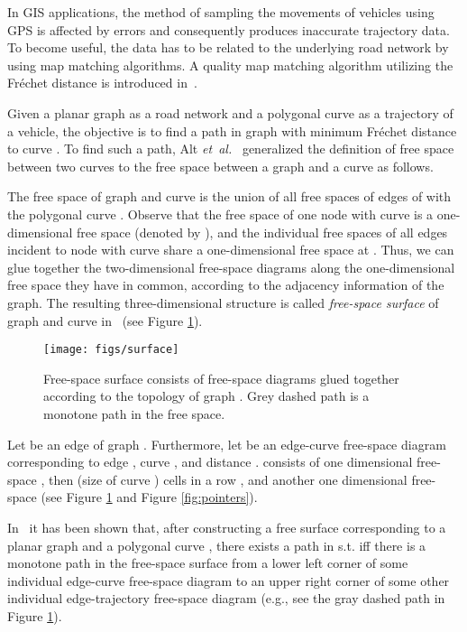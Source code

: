 \documentclass[12pt]{dalthesis}
\newcommand{\etal}{{\em et~al.\/}}
\newcommand{\Frechet}{Fr\'echet }
\begin{document}
In GIS applications, the method of sampling the  movements of vehicles using GPS is affected 
by errors and consequently produces inaccurate trajectory data. To become useful, 
the data has to be related to the underlying road network by using map matching 
algorithms. A quality map matching algorithm utilizing the \Frechet distance is 
introduced in~\cite{AltERW03a}.

Given a planar graph  as a road network and a polygonal curve  as a 
trajectory of a vehicle, the objective is to find a path   
in graph  with minimum \Frechet distance to curve . To find such a path, 
Alt \etal ~\cite{AltERW03a} generalized  the definition of free space 
between two curves to the free space between a graph and a curve as follows.

The free space of graph   and  curve  is the union of all free spaces of edges of 
 with the polygonal curve . Observe that the free space of one node  with 
curve  is a one-dimensional free space (denoted by ), 
and the individual free spaces of all 	edges 
incident to node  with curve  share a one-dimensional free space at . 
Thus, we can 
glue together the two-dimensional free-space diagrams along the one-dimensional free space 
they have in common, according to the adjacency information of the graph. 
The resulting three-dimensional structure is called \emph{free-space surface} of graph  and curve  
in~\cite{AltERW03a} (see Figure \ref{fig:freespacesurface}). 

\begin{figure}[t]
	\centering
	\texttt{[image: figs/surface]}
	\caption{Free-space surface consists of free-space diagrams glued
together according to the topology of graph . Grey dashed path is
a monotone path in the free space.}
	\label{fig:freespacesurface}
\end{figure}

Let  be an edge of graph . Furthermore,  
let  be an edge-curve free-space diagram 
corresponding to edge , curve , and distance .
  consists of one dimensional free-space ,
then  (size of curve ) cells in a row , 
and another one dimensional free-space (see Figure \ref{fig:freespacesurface}
and Figure \ref{fig:pointers}).


In~\cite{AltERW03a} it has been shown that, after constructing 
a free surface corresponding 
to a planar graph  and a polygonal curve ,  there exists a 
path  in  s.t.  
iff there is a monotone path 
in the free-space surface from a lower left corner of
some individual edge-curve free-space diagram to an upper
 right corner of some other individual edge-trajectory 
free-space diagram (e.g., see the gray dashed path 
in Figure \ref{fig:freespacesurface}).
\end{document}
